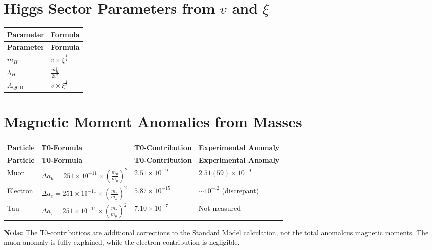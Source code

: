 \documentclass[12pt,a4paper]{article}
\begin{document}
	\section{Higgs Sector Parameters from $v$ and $\xi$}
	\begin{longtable}{|p{5cm}|p{6cm}|}
		\hline
		\textbf{Parameter} & \textbf{Formula} \\
		\hline
		\endfirsthead
		\hline
		\textbf{Parameter} & \textbf{Formula} \\
		\hline
		\endhead
		$m_H$ & $v \times \xi^{\frac{1}{4}}$ \\
		\hline
		$\lambda_H$ & $\frac{m_H^{2}}{2v^{2}}$ \\
		\hline
		$\Lambda_{\text{QCD}}$ & $v \times \xi^{\frac{1}{3}}$ \\
		\hline
	\end{longtable}
	
	\section{Magnetic Moment Anomalies from Masses}
	\begin{longtable}{|p{3cm}|p{5cm}|p{4cm}|p{3cm}|}
		\hline
		\textbf{Particle} & \textbf{T0-Formula} & \textbf{T0-Contribution} & \textbf{Experimental Anomaly} \\
		\hline
		\endfirsthead
		\hline
		\textbf{Particle} & \textbf{T0-Formula} & \textbf{T0-Contribution} & \textbf{Experimental Anomaly} \\
		\hline
		\endhead
		Muon & $\Delta a_{\mu} = 251 \times 10^{-11} \times \left(\frac{m_{\mu}}{m_{\mu}}\right)^{2}$ & $2.51 \times 10^{-9}$ & $2.51(59) \times 10^{-9}$ \\
		\hline
		Electron & $\Delta a_{e} = 251 \times 10^{-11} \times \left(\frac{m_{e}}{m_{\mu}}\right)^{2}$ & $5.87 \times 10^{-15}$ & $\sim 10^{-12}$ (discrepant) \\
		\hline
		Tau & $\Delta a_{\tau} = 251 \times 10^{-11} \times \left(\frac{m_{\tau}}{m_{\mu}}\right)^{2}$ & $7.10 \times 10^{-7}$ & Not measured \\
		\hline
	\end{longtable}
	
	\textbf{Note:} The T0-contributions are additional corrections to the Standard Model calculation, not the total anomalous magnetic moments. The muon anomaly is fully explained, while the electron contribution is negligible.
	
\end{document}
